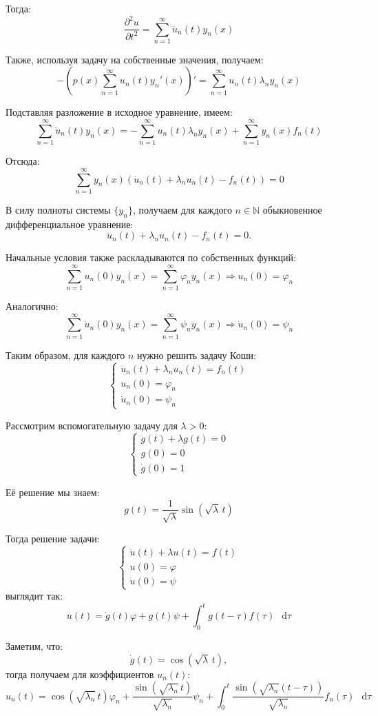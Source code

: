 \documentclass[11pt,a4paper]{report}
\numberwithin{equation}{section}
\numberwithin{figure}{chapter}
\numberwithin{table}{chapter}
\newcommand{\dd}{\mathop{}\!\mathrm{d}}
\begin{document}
Тогда:
\[
\dfrac{\partial^2 u}{\partial t^2}
=
\sum_{n=1}^{\infty} \ddot u_n(t)y_n(x)
\]

Также, используя задачу на собственные значения, получаем:
\[
-\left(
p(x)\sum_{n=1}^{\infty}u_n(t)y_n'(x)
\right)'
=
\sum_{n=1}^{\infty}u_n(t)\lambda_n y_n(x)
\]

Подставляя разложение в исходное уравнение, имеем:
\[
\sum_{n=1}^{\infty}\ddot u_n(t)y_n(x)
=
-\sum_{n=1}^{\infty}u_n(t)\lambda_n y_n(x)
+
\sum_{n=1}^{\infty}y_n(x)f_n(t)
\]

Отсюда:
\[
\sum_{n=1}^{\infty}
y_n(x)
\left(
\ddot u_n(t)+\lambda_n u_n(t)-f_n(t)
\right)
=0
\]

В силу полноты системы $\{y_n\}$, получаем для каждого $n\in\mathbb{N}$
обыкновенное дифференциальное уравнение:
\[
\ddot u_n(t)+\lambda_n u_n(t)-f_n(t)=0.
\]

Начальные условия также раскладываются по собственных функций:
\[
\sum_{n=1}^{\infty}u_n(0)y_n(x)
=
\sum_{n=1}^{\infty}\varphi_n y_n(x)
\Rightarrow
u_n(0)=\varphi_n
\]

Аналогично:
\[
\sum_{n=1}^{\infty}\dot u_n(0)y_n(x)
=
\sum_{n=1}^{\infty}\psi_n y_n(x)
\Rightarrow
\dot u_n(0)=\psi_n
\]

Таким образом, для каждого $n$ нужно решить задачу Коши:
\[
\begin{cases}
\ddot u_n(t)+\lambda_n u_n(t)=f_n(t)
\\[0.5em]
u_n(0)=\varphi_n
\\[0.5em]
\dot u_n(0)=\psi_n
\end{cases}
\]

Рассмотрим вспомогательную задачу для $ \lambda>0$:
\[
\begin{cases}
\ddot g(t)+\lambda g(t)=0
\\[0.5em]
g(0)=0
\\[0.5em]
\dot g(0)=1
\end{cases}
\]

Её решение мы знаем:
\[
g(t)=\dfrac{1}{\sqrt{\lambda}}\sin(\sqrt{\lambda}\,t)
\]

Тогда решение задачи:
\[
\begin{cases}
\ddot u(t)+\lambda u(t)=f(t)
\\[0.5em]
u(0)=\varphi
\\[0.5em]
\dot u(0)=\psi
\end{cases}
\]
выглядит так:
\[
u(t)
=
\dot g(t)\varphi
+
g(t)\psi
+
\int_0^t g(t-\tau)f(\tau)\,\dd \tau
\]

Заметим, что:
\[
\dot g(t)=\cos(\sqrt{\lambda}\,t),
\]
тогда получаем для коэффициентов $u_n(t)$:
\[
u_n(t)
=
\cos(\sqrt{\lambda_n}\,t)\varphi_n
+
\dfrac{\sin(\sqrt{\lambda_n}\,t)}{\sqrt{\lambda_n}}\psi_n
+
\int_0^t
\dfrac{\sin(\sqrt{\lambda_n}(t-\tau))}{\sqrt{\lambda_n}}
f_n(\tau)\,\dd \tau
\]
\end{document}

